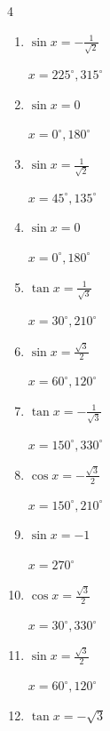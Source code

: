 \begin{multicols}{4}
\begin{enumerate}
        $\displaystyle x = 120^{\circ} , 300^{\circ}$

  \item $\displaystyle \sin{x}  = -\frac{1}{\sqrt{2}}$

        $\displaystyle x = 225^{\circ} , 315^{\circ}$

  \item $\displaystyle \sin{x}  = 0$

        $\displaystyle x = 0^{\circ} , 180^{\circ}$

  \item $\displaystyle \sin{x}  = \frac{1}{\sqrt{2}}$

        $\displaystyle x = 45^{\circ} , 135^{\circ}$

  \item $\displaystyle \sin{x}  = 0$

        $\displaystyle x = 0^{\circ} , 180^{\circ}$

  \item $\displaystyle \tan{x}  = \frac{1}{\sqrt{3}}$

        $\displaystyle x = 30^{\circ} , 210^{\circ}$

  \item $\displaystyle \sin{x}  = \frac{\sqrt{3}}{2}$

        $\displaystyle x = 60^{\circ} , 120^{\circ}$

  \item $\displaystyle \tan{x}  = -\frac{1}{\sqrt{3}}$

        $\displaystyle x = 150^{\circ} , 330^{\circ}$

  \item $\displaystyle \cos{x}  = -\frac{\sqrt{3}}{2}$

        $\displaystyle x = 150^{\circ} , 210^{\circ}$

  \item $\displaystyle \sin{x}  = -1$

        $\displaystyle x = 270^{\circ}$

  \item $\displaystyle \cos{x}  = \frac{\sqrt{3}}{2}$

        $\displaystyle x = 30^{\circ} , 330^{\circ}$

  \item $\displaystyle \sin{x}  = \frac{\sqrt{3}}{2}$

        $\displaystyle x = 60^{\circ} , 120^{\circ}$

  \item $\displaystyle \tan{x}  = -\sqrt{3}$


\end{enumerate}
\end{multicols}
